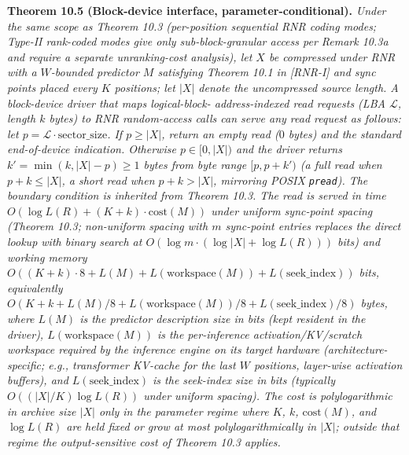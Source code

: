 \documentclass[
]{article}
\begin{document}
\textbf{Theorem 10.5 (Block-device interface, parameter-conditional).}
\emph{Under the same scope as Theorem 10.3 (per-position sequential
RNR coding modes; Type-II rank-coded modes give only
sub-block-granular access per Remark 10.3a and require a separate
unranking-cost analysis), let $X$ be compressed under RNR with a
$W$-bounded predictor $M$ satisfying Theorem 10.1 in [RNR-I] and sync points
placed every $K$ positions; let $|X|$ denote the uncompressed
source length. A block-device driver that maps logical-block-
address-indexed read requests (LBA $\mathcal{L}$, length $k$ bytes)
to RNR random-access calls can serve any read request as follows: let $p = \mathcal{L}
\cdot \text{sector\_size}$. If $p \geq |X|$, return an empty read
($0$ bytes) and the standard end-of-device indication. Otherwise
$p \in [0, |X|)$ and the driver returns $k' = \min(k, |X| - p)
\geq 1$ bytes from byte range $[p, p+k')$ (a full read when
$p+k \leq |X|$, a short read when $p+k > |X|$, mirroring POSIX
\texttt{pread}). The boundary condition is inherited from Theorem
10.3. The read is served in time
$O(\log L(R) + (K + k) \cdot \mathrm{cost}(M))$ under uniform
sync-point spacing (Theorem 10.3; non-uniform spacing with $m$
sync-point entries replaces the direct lookup with binary search
at $O(\log m \cdot (\log |X| + \log L(R)))$ bits) and
working memory $O((K + k) \cdot 8 + L(M) + L(\mathrm{workspace}(M))
+ L(\mathrm{seek\_index}))$ \emph{bits}, equivalently
$O(K + k + L(M)/8 + L(\mathrm{workspace}(M))/8 +
L(\mathrm{seek\_index})/8)$ \emph{bytes}, where $L(M)$ is the
predictor description size in bits (kept resident in the driver),
$L(\mathrm{workspace}(M))$ is the per-inference activation/KV/scratch
workspace required by the inference engine on its target hardware
(architecture-specific; e.g., transformer KV-cache for the last
$W$ positions, layer-wise activation buffers), and
$L(\mathrm{seek\_index})$ is the seek-index size in bits (typically
$O((|X|/K) \log L(R))$ under uniform spacing). The cost is polylogarithmic in
archive size $|X|$ only in the parameter regime where $K$, $k$,
$\mathrm{cost}(M)$, and $\log L(R)$ are held fixed or grow at most
polylogarithmically in $|X|$; outside that regime the
output-sensitive cost of Theorem 10.3 applies.}
\end{document}
